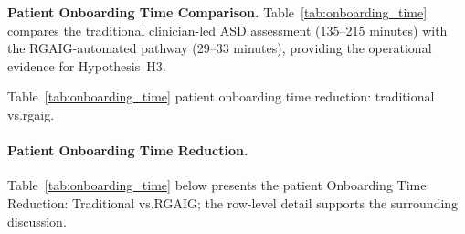 \noindent\textbf{Patient Onboarding Time Comparison.} Table~\ref{tab:onboarding_time} compares the traditional clinician-led ASD assessment (135--215 minutes) with the RGAIG-automated pathway (29--33 minutes), providing the operational evidence for Hypothesis~H3.


\noindent Table~\ref{tab:onboarding_time} patient onboarding time reduction: traditional vs.rgaig.

\paragraph{Patient Onboarding Time Reduction.}


\noindent Table~\ref{tab:onboarding_time} below presents the patient Onboarding Time Reduction: Traditional vs.RGAIG; the row-level detail supports the surrounding discussion.

